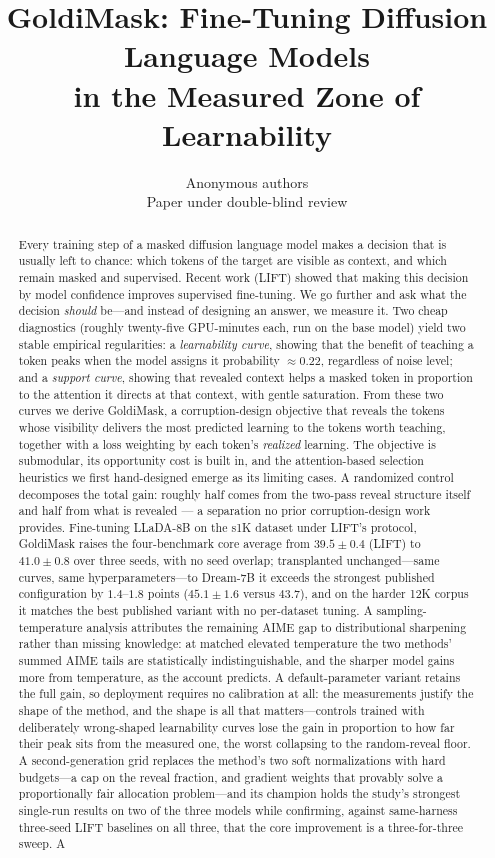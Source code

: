 \documentclass{article} %
\title{GoldiMask: Fine-Tuning Diffusion Language Models\\in the Measured Zone of Learnability}
\author{Anonymous authors\\
Paper under double-blind review}
\begin{document}
\maketitle

\begin{abstract}
Every training step of a masked diffusion language model makes a decision that is usually left to chance: which tokens of the target are visible as context, and which remain masked and supervised. Recent work (LIFT) showed that making this decision by model confidence improves supervised fine-tuning. We go further and ask what the decision \emph{should} be---and instead of designing an answer, we measure it. Two cheap diagnostics (roughly twenty-five GPU-minutes each, run on the base model) yield two stable empirical regularities: a \emph{learnability curve}, showing that the benefit of teaching a token peaks when the model assigns it probability $\approx 0.22$, regardless of noise level; and a \emph{support curve}, showing that revealed context helps a masked token in proportion to the attention it directs at that context, with gentle saturation. From these two curves we derive GoldiMask, a corruption-design objective that reveals the tokens whose visibility delivers the most predicted learning to the tokens worth teaching, together with a loss weighting by each token's \emph{realized} learning. The objective is submodular, its opportunity cost is built in, and the attention-based selection heuristics we first hand-designed emerge as its limiting cases. A randomized control decomposes the total gain: roughly half comes from the two-pass reveal structure itself and half from what is revealed --- a separation no prior corruption-design work provides. Fine-tuning LLaDA-8B on the s1K dataset under LIFT's protocol, GoldiMask raises the four-benchmark core average from $39.5 \pm 0.4$ (LIFT) to $41.0 \pm 0.8$ over three seeds, with no seed overlap; transplanted unchanged---same curves, same hyperparameters---to Dream-7B it exceeds the strongest published configuration by $1.4$--$1.8$ points ($45.1 \pm 1.6$ versus $43.7$), and on the harder 12K corpus it matches the best published variant with no per-dataset tuning. A sampling-temperature analysis attributes the remaining AIME gap to distributional sharpening rather than missing knowledge: at matched elevated temperature the two methods' summed AIME tails are statistically indistinguishable, and the sharper model gains more from temperature, as the account predicts. A default-parameter variant retains the full gain, so deployment requires no calibration at all: the measurements justify the shape of the method, and the shape is all that matters---controls trained with deliberately wrong-shaped learnability curves lose the gain in proportion to how far their peak sits from the measured one, the worst collapsing to the random-reveal floor. A second-generation grid replaces the method's two soft normalizations with hard budgets---a cap on the reveal fraction, and gradient weights that provably solve a proportionally fair allocation problem---and its champion holds the study's strongest single-run results on two of the three models while confirming, against same-harness three-seed LIFT baselines on all three, that the core improvement is a three-for-three sweep. A 
\end{abstract}
\end{document}
